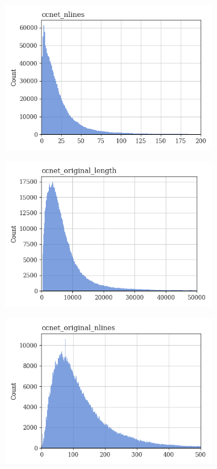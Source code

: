 \documentclass{article}
\begin{document}
\begin{figure}
\begin{subfigure}[b]{0.32\textwidth}
         \includegraphics[width=\textwidth]{figures/quality_signals/ccnet_nlines.png}
     \end{subfigure}
     \begin{subfigure}[b]{0.32\textwidth}
         \centering
         \includegraphics[width=\textwidth]{figures/quality_signals/ccnet_original_length.png}
     \end{subfigure}
     \hfill
     \begin{subfigure}[b]{0.32\textwidth}
         \centering
         \includegraphics[width=\textwidth]{figures/quality_signals/ccnet_original_nlines.png}

\end{subfigure}
\end{figure}
\end{document}
